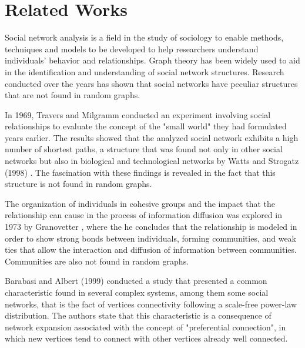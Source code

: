 \chapter{Related Works}
\label{cap:RW}


Social network analysis is a field in the study of sociology to enable methods, techniques and models to be developed to help researchers understand individuals' behavior and relationships. Graph theory has been widely used to aid in the identification and understanding of social network structures. Research conducted over the years has shown that social networks have peculiar structures that are not found in random graphs.

In 1969, Travers and Milgramm \cite{Travers:1967} conducted an experiment involving social relationships to evaluate the concept of the "small world" they had formulated years earlier. The results showed that the analyzed social network exhibits a high number of shortest paths, a structure that was found not only in other social networks but also in biological and technological networks by Watts and Strogatz (1998) \cite{Watts1998}. The fascination with these findings is revealed in the fact that this structure is not found in random graphs.

The organization of individuals in cohesive groups and the impact that the relationship can cause in the process of information diffusion was explored in 1973 by Granovetter \cite{Granovetter1973}, where the he concludes that the relationship is modeled in order to show strong bonds between individuals, forming communities, and weak ties that allow the interaction and diffusion of information between communities. Communities are also not found in random graphs.

Barabasi and Albert (1999) \cite{Barabasi509} conducted a study that presented a common characteristic found in several complex systems, among them some social networks, that is the fact of vertices connectivity following a scale-free power-law distribution. The authors state that this characteristic is a consequence of network expansion associated with the concept of "preferential connection", in which new vertices tend to connect with other vertices already well connected.

